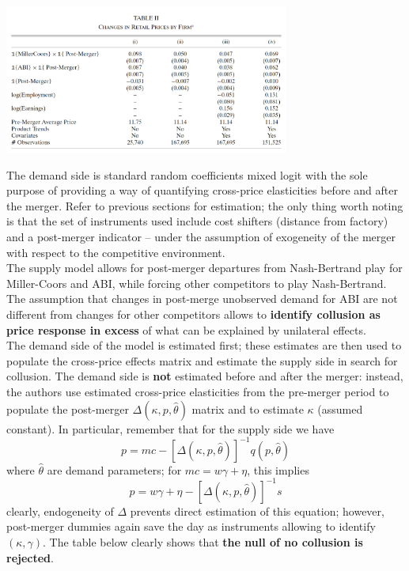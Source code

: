 \documentclass[11pt]{article}
\numberwithin{equation}{section}
\begin{document}
\begin{center}
	\includegraphics[width=0.7\textwidth]{mw1}
\end{center}

The demand side is standard random coefficients mixed logit with the sole purpose of providing a way of quantifying cross-price elasticities before and after the merger.
Refer to previous sections for estimation; the only thing worth noting is that the set of instruments used include cost shifters (distance from factory) and a post-merger indicator -- under the assumption of exogeneity of the merger with respect to the competitive environment.  \\

The supply model allows for post-merger departures from Nash-Bertrand play for Miller-Coors and ABI, while forcing other competitors to play Nash-Bertrand.
The assumption that changes in post-merge unobserved demand for ABI are not different from changes for other competitors allows to \textbf{identify collusion as price response in excess} of what can be explained by unilateral effects. \\

The demand side of the model is estimated first; these estimates are then used to populate the cross-price effects matrix and estimate the supply side in search for collusion.
The demand side is \textbf{not} estimated before and after the merger: instead, the authors use estimated cross-price elasticities from the pre-merger period to populate the post-merger $\Delta(\kappa, p, \hat{\theta})$ matrix and to estimate $\kappa$ (assumed constant).
In particular, remember that for the supply side we have
\begin{equation*}
  p = mc - [\Delta(\kappa, p, \hat{\theta})]^{-1}q(p,\hat{\theta})
\end{equation*}
where $\hat{\theta}$ are demand parameters; for $mc = w\gamma + \eta$, this implies
\begin{equation}
  p = w\gamma + \eta - [\Delta(\kappa, p, \hat{\theta})]^{-1}s
\end{equation}
clearly, endogeneity of $\Delta$ prevents direct estimation of this equation; however, post-merger dummies again save the day as instruments allowing to identify $(\kappa, \gamma)$.
The table below clearly shows that \textbf{the null of no collusion is rejected}. \\
\end{document}
